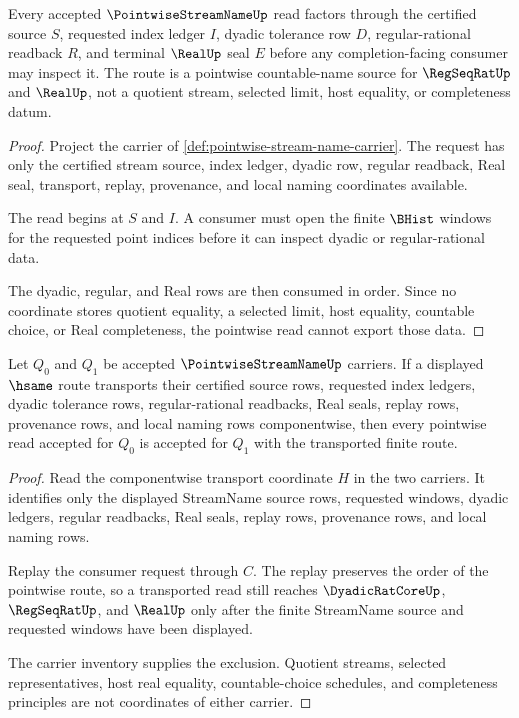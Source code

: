 \begin{theorem}
\label{thm:pointwise-stream-name-finite-read}
Every accepted $\PointwiseStreamNameUp$ read factors through the certified source $S$, requested index ledger $I$, dyadic tolerance row $D$, regular-rational readback $R$, and terminal $\RealUp$ seal $E$ before any completion-facing consumer may inspect it. The route is a pointwise countable-name source for $\RegSeqRatUp$ and $\RealUp$, not a quotient stream, selected limit, host equality, or completeness datum.
\end{theorem}
\begin{proof}
Project the carrier of \autoref{def:pointwise-stream-name-carrier}. The request has only the certified stream source, index ledger, dyadic row, regular readback, Real seal, transport, replay, provenance, and local naming coordinates available.

The read begins at $S$ and $I$. A consumer must open the finite $\BHist$ windows for the requested point indices before it can inspect dyadic or regular-rational data.

The dyadic, regular, and Real rows are then consumed in order. Since no coordinate stores quotient equality, a selected limit, host equality, countable choice, or Real completeness, the pointwise read cannot export those data.
\end{proof}

\begin{theorem}
\label{thm:pointwise-stream-name-transport-stability}
Let $Q_0$ and $Q_1$ be accepted $\PointwiseStreamNameUp$ carriers. If a displayed $\hsame$ route transports their certified source rows, requested index ledgers, dyadic tolerance rows, regular-rational readbacks, Real seals, replay rows, provenance rows, and local naming rows componentwise, then every pointwise read accepted for $Q_0$ is accepted for $Q_1$ with the transported finite route.
\end{theorem}
\begin{proof}
Read the componentwise transport coordinate $H$ in the two carriers. It identifies only the displayed StreamName source rows, requested windows, dyadic ledgers, regular readbacks, Real seals, replay rows, provenance rows, and local naming rows.

Replay the consumer request through $C$. The replay preserves the order of the pointwise route, so a transported read still reaches $\DyadicRatCoreUp$, $\RegSeqRatUp$, and $\RealUp$ only after the finite StreamName source and requested windows have been displayed.

The carrier inventory supplies the exclusion. Quotient streams, selected representatives, host real equality, countable-choice schedules, and completeness principles are not coordinates of either carrier.
\end{proof}

